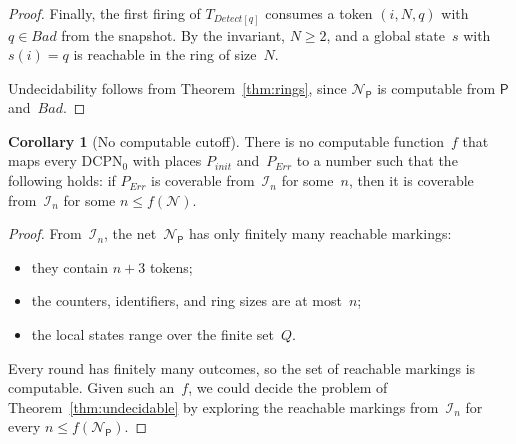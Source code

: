 \documentclass[11pt]{article}
\theoremstyle{definition}
\newcommand{\DCPN}[1]{\texorpdfstring{\textup{DCPN}\ensuremath{_{#1}}}{DCPN#1}}
\newtheorem{corollary}{Corollary}
\begin{document}
\begin{proof}
  Finally, the first firing of $T_{\mathit{Detect}[q]}$ consumes a token
  $(i, N, q)$ with $q \in \mathit{Bad}$ from the snapshot. By the
  invariant, $N \ge 2$, and a global state~$s$ with $s(i) = q$ is reachable
  in the ring of size~$N$.

  Undecidability follows from Theorem~\ref{thm:rings}, since
  $\mathcal{N}_{\mathsf{P}}$ is computable from $\mathsf{P}$
  and~$\mathit{Bad}$.
\end{proof}

\begin{corollary}[No computable cutoff]\label{cor:cutoff}
  There is no computable function~$f$ that maps every \DCPN{0} with places
  $P_{\mathit{init}}$ and~$P_{\mathit{Err}}$ to a number such that the
  following holds: if $P_{\mathit{Err}}$ is coverable from~$\mathcal{I}_n$
  for some~$n$, then it is coverable from~$\mathcal{I}_n$ for some
  $n \le f(\mathcal{N})$.
\end{corollary}

\begin{proof}
  From~$\mathcal{I}_n$, the net~$\mathcal{N}_{\mathsf{P}}$ has only finitely
  many reachable markings:
  \begin{itemize}
    \item they contain $n + 3$ tokens;
    \item the counters, identifiers, and ring sizes are at most~$n$;
    \item the local states range over the finite set~$Q$.
  \end{itemize}
  Every round has finitely many outcomes, so the set of reachable markings is
  computable. Given such an~$f$, we could decide the problem of
  Theorem~\ref{thm:undecidable} by exploring the reachable markings
  from~$\mathcal{I}_n$ for every $n \le f(\mathcal{N}_{\mathsf{P}})$.
\end{proof}
\end{document}

